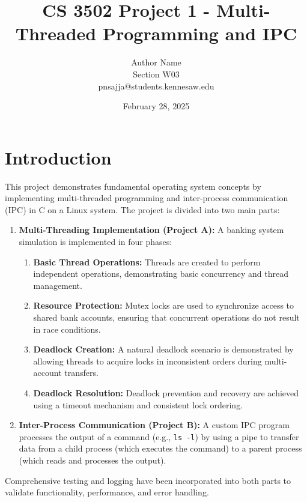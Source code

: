 \documentclass[11pt]{article}
\title{CS 3502 Project 1 - Multi-Threaded Programming and IPC}
\author{Author Name \\ Section W03 \\ pnsajja@students.kennesaw.edu}
\date{February 28, 2025}
\begin{document}
\maketitle
\thispagestyle{empty}

\newpage

\tableofcontents
\newpage

\section{Introduction}
This project demonstrates fundamental operating system concepts by implementing multi-threaded programming and inter-process communication (IPC) in C on a Linux system. The project is divided into two main parts:
\begin{enumerate}[label=\textbf{\arabic*.}]
    \item \textbf{Multi-Threading Implementation (Project A):} A banking system simulation is implemented in four phases:
    \begin{enumerate}[label=\textbf{Phase \arabic*:}, itemsep=0pt]
        \item \textbf{Basic Thread Operations:} Threads are created to perform independent operations, demonstrating basic concurrency and thread management.
        \item \textbf{Resource Protection:} Mutex locks are used to synchronize access to shared bank accounts, ensuring that concurrent operations do not result in race conditions.
        \item \textbf{Deadlock Creation:} A natural deadlock scenario is demonstrated by allowing threads to acquire locks in inconsistent orders during multi-account transfers.
        \item \textbf{Deadlock Resolution:} Deadlock prevention and recovery are achieved using a timeout mechanism and consistent lock ordering.
    \end{enumerate}
    \item \textbf{Inter-Process Communication (Project B):} A custom IPC program processes the output of a command (e.g., \texttt{ls -l}) by using a pipe to transfer data from a child process (which executes the command) to a parent process (which reads and processes the output).
\end{enumerate}
Comprehensive testing and logging have been incorporated into both parts to validate functionality, performance, and error handling.
\end{document}
